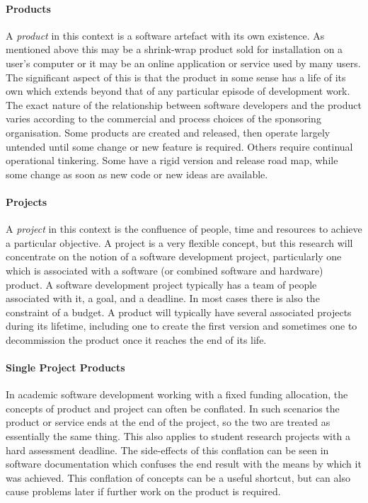 \paragraph{Products}

A \emph{product} in this context is a software artefact with its own existence. As mentioned above this may be a shrink-wrap product sold for installation on a user's computer or it may be an online application or service used by many users. The significant aspect of this is that the product in some sense has a life of its own which extends beyond that of any particular episode of development work. The exact nature of the relationship between software developers and the product varies according to the commercial and process choices of the sponsoring organisation. Some products are created and released, then operate largely untended until some change or new feature is required. Others require continual operational tinkering. Some have a rigid version and release road map, while some change as soon as new code or new ideas are available.

\paragraph{Projects}

A \emph{project} in this context is the confluence of people, time and resources to achieve a particular objective. A project is a very flexible concept, but this research will concentrate on the notion of a software development project, particularly one which is associated with a software (or combined software and hardware) product. A software development project typically has a team of people associated with it, a goal, and a deadline. In most cases there is also the constraint of a budget. A product will typically have several associated projects during its lifetime, including one to create the first version and sometimes one to decommission the product once it reaches the end of its life.

\paragraph{Single Project Products}

In academic software development working with a fixed funding allocation, the concepts of product and project can often be conflated. In such scenarios the product or service ends at the end of the project, so the two are treated as essentially the same thing. This also applies to student research projects with a hard assessment deadline. The side-effects of this conflation can be seen in software documentation which confuses the end result with the means by which it was achieved. This conflation of concepts can be a useful shortcut, but can also cause problems later if further work on the product is required.

